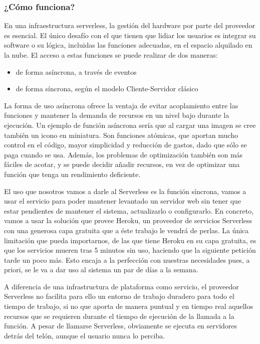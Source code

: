 \subsubsection{¿Cómo funciona?}
En una infraestructura serverless, la gestión del hardware por parte del proveedor es esencial. El único desafío con el que tienen que lidiar los usuarios es integrar su software o su lógica, incluidas las funciones adecuadas, en el espacio alquilado en la nube. El acceso a estas funciones se puede realizar de dos maneras:
\begin{itemize}
    \item de forma asíncrona, a través de eventos
    \item de forma síncrona, según el modelo Cliente-Servidor clásico
\end{itemize}
\par La forma de uso asíncrona ofrece la ventaja de evitar acoplamiento entre las funciones y mantener la demanda de recursos en un nivel bajo durante la ejecución. Un ejemplo de función asíncrona sería que al cargar una imagen se cree también un icono en miniatura. Son funciones atómicas, que aportan mucho control en el código, mayor simplicidad y reducción de gastos, dado que sólo se paga cuando se usa. Además, los problemas de optimización también son más fáciles de acotar, y se puede decidir añadir recursos, en vez de optimizar una función que tenga un rendimiento deficiente.%
\par El uso que nosotros vamos a darle al Serverless es la función síncrona, vamos a usar el servicio para poder mantener levantado un servidor web sin tener que estar pendientes de mantener el sistema, actualizarlo o configurarlo. En concreto, vamos a usar la solución que provee Heroku, un proveedor de servicios Serverless con una generosa capa gratuita que a éste trabajo le vendrá de perlas. La única limitación que pueda importarnos, de las que tiene Heroku en su capa gratuita, es que los servicios mueren tras 5 minutos sin uso, haciendo que la siguiente petición tarde un poco más. Esto encaja a la perfección con nuestras necesidades pues, a priori, se le va a dar uso al sistema un par de días a la semana.
\par A diferencia de una infrastructura de plataforma como servicio, el proveedor Serverless no facilita para ello un entorno de trabajo duradero para todo el tiempo de trabajo, si no que aporta de manera puntual y en tiempo real aquellos recursos que se requieren durante el tiempo de ejecución de la llamada a la función. A pesar de llamarse Serverless, obviamente se ejecuta en servidores detrás del telón, aunque el usuario nunca lo perciba.
